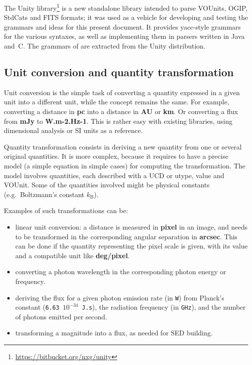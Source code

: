 \documentclass[11pt,notitlepage,onecolumn]{ivoa}
\def\eg{e.g.~}
\newcommand{\unit}[1]{\textbf{\textsf{\color{orange}#1}}}
\begin{document}
The Unity library\footnote{\url{https://bitbucket.org/nxg/unity}} is a new
standalone library intended to parse VOUnits, OGIP, StdCats and FITS
formats; it was used as a vehicle for developing and testing the grammars and
ideas for this present document.  It provides yacc-style grammars for
the various syntaxes, as well as implementing them in parsers written
in Java and~C.  The grammars of  are extracted
from the Unity distribution.

\subsection{Unit conversion and quantity transformation\label{sec:conversion}}

Unit conversion is the simple task of converting a quantity expressed in a given unit into a different unit, while
the concept remains the same. For example, converting a distance in \unit{pc} into a distance in \unit{AU} or \unit{km}.
Or converting a flux from \unit{mJy} to \unit{W.m-2.Hz-1}. This is rather easy with existing libraries, using dimensional
analysis or SI units as a reference.

Quantity transformation consists in deriving a new quantity from one or several original
quantities. It is more complex, because it requires to have a precise model 
(a simple equation in simple cases) for computing the transformation. The model involves
quantities, each described with a UCD or utype, value and VOUnit. Some of the quantities
involved might be physical constants (\eg  Boltzmann's constant $k_{\mathrm{B}}$).

Examples of such transformations can be:
\begin{itemize}
\item linear unit conversion: a distance is measured in \unit{pixel} in an image, and needs to be transformed in
the corresponding angular separation in \unit{arcsec}. This can be done if the quantity representing the pixel
scale is given, with its value and a compatible unit like \unit{deg/pixel}.
\item converting a photon wavelength in the corresponding photon energy or frequency.
\item deriving the flux for a given photon emission rate (in \texttt{W}) from Planck's
constant (\texttt{6.63 $10^{-34}$ J.s}), the radiation frequency (in \texttt{GHz}), and the
number of photons emitted per second.
\item transforming a magnitude into a flux, as needed for SED building.
\end{itemize}
\end{document}
